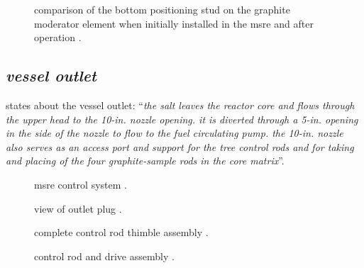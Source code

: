 \documentclass[ms,a4paper]{memoir}
\newcommand*{\mrsarchive}{../../msr-archive}%
\begin{document}
\begin{figure}[H]
  \centering
  \caption{comparison of the bottom positioning stud on the graphite moderator element when initially installed in the msre and after operation \parencite[figure 13.3]{ornl-4676}.}
  \label{4676-fig13-3}
\end{figure}



\subsection{\emph{vessel outlet}}
\parencite[page 84-85]{ornl-tm-0728} states about the vessel outlet:
\enquote{\textit{the salt leaves the reactor core and flows through the upper head to the 10-in. nozzle opening. it is diverted through a 5-in. opening in the side of the nozzle to flow to the fuel circulating pump. the 10-in. nozzle also serves as an access port and support for the tree control rods and for taking and placing of the four graphite-sample rods in the core matrix}}.

\begin{figure}[H]
  \centering
  \caption{msre control system \parencite[figure 14c]{ad-cf-61-2-46}.}
  \label{61246-fig14c}
\end{figure}

\begin{figure}[H]
  \centering
  \centering
  \caption{view of outlet plug \parencite[figure 1.2]{ornl-4676}.}
  \label{4676-fig1-2}
\end{figure}

\begin{figure}[H]
  \centering
  \caption{complete control rod thimble assembly \parencite[figure 43]{ornl-3708}.}
\end{figure}

\begin{figure}[H]
  \centering
  \caption{control rod and drive assembly \parencite[figure 5.14]{ornl-tm-0728}.}
\end{figure}
\end{document}

